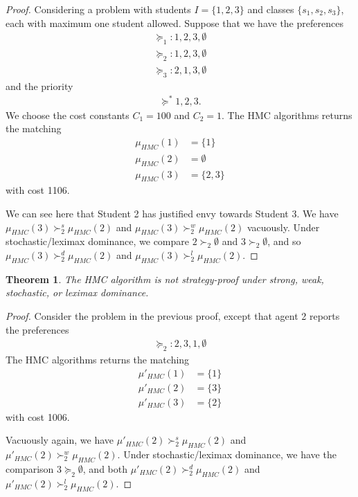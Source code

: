 \documentclass[12pt,letterpaper]{extarticle}
\newtheorem{theo}{Theorem}
\begin{document}
\begin{proof}
Considering a problem with students $I = \{1,2,3\}$ and classes $\{s_1,s_2,s_3\}$, each with maximum one student allowed. Suppose that we have the preferences
\begin{align*}
    \succcurlyeq_1 : 1,2,3,\emptyset \\
    \succcurlyeq_2 : 1,2,3,\emptyset \\
    \succcurlyeq_3 : 2,1,3,\emptyset
\end{align*}
and the priority
\begin{align*}
    \succcurlyeq^* 1,2,3.
\end{align*}
We choose the cost constants $C_1 = 100$ and $C_2 = 1$. The HMC algorithms returns the matching
\begin{align*}
    \mu_{HMC}(1) &= \{1\} \\
    \mu_{HMC}(2) &= \emptyset \\
    \mu_{HMC}(3) &= \{2,3\}
\end{align*}
with cost 1106.

We can see here that Student 2 has justified envy towards Student 3. We have $\mu_{HMC}(3) \succ_2^s \mu_{HMC}(2)$ and $\mu_{HMC}(3) \succ_2^w \mu_{HMC}(2)$ vacuously. Under stochastic/leximax dominance, we compare $2 \succ_{2}\emptyset$ and $3 \succ_{2}\emptyset$, and so $\mu_{HMC}(3) \succ_2^d \mu_{HMC}(2)$ and $\mu_{HMC}(3) \succ_2^l \mu_{HMC}(2)$.
\end{proof}

\begin{theo}
The HMC algorithm is not strategy-proof under strong, weak, stochastic, or leximax dominance.
\end{theo}

\begin{proof}
Consider the problem in the previous proof, except that agent 2 reports the preferences
\begin{align*}
    \succcurlyeq_2 : 2,3,1,\emptyset
\end{align*}
The HMC algorithms returns the matching
\begin{align*}
    \mu'_{HMC}(1) &= \{1\} \\
    \mu'_{HMC}(2) &= \{3\} \\
    \mu'_{HMC}(3) &= \{2\}
\end{align*}
with cost 1006.

Vacuously again, we have $\mu'_{HMC}(2) \succ_2^s \mu_{HMC}(2)$ and $\mu'_{HMC}(2) \succ_2^w \mu_{HMC}(2)$. Under stochastic/leximax dominance, we have the comparison $3 \succcurlyeq_2 \emptyset$, and both $\mu'_{HMC}(2) \succ_2^d \mu_{HMC}(2)$ and $\mu'_{HMC}(2) \succ_2^l \mu_{HMC}(2)$.
\end{proof}
\end{document}
